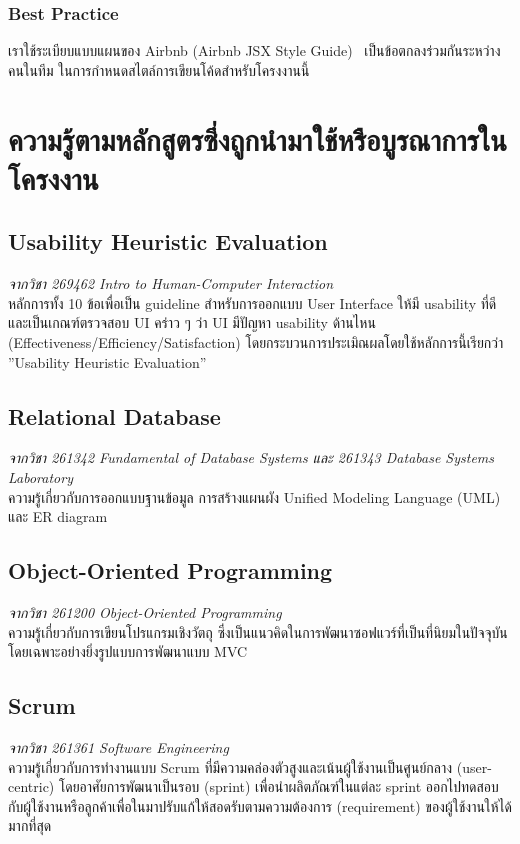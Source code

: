 \subsubsection{Best Practice}
เราใช้ระเบียบแบบแผนของ Airbnb (Airbnb JSX Style Guide)~\cite{airbnb_jsx} เป็นข้อตกลงร่วมกันระหว่างคนในทีม ในการกำหนดสไตล์การเขียนโค้ดสำหรับโครงงานนี้

\section{ความรู้ตามหลักสูตรซึ่งถูกนำมาใช้หรือบูรณาการในโครงงาน}
\subsection{Usability Heuristic Evaluation}
\textit{จากวิชา 269462 Intro to Human-Computer Interaction} \\
หลักการทั้ง 10 ข้อเพื่อเป็น guideline สำหรับการออกแบบ User Interface ให้มี usability ที่ดีและเป็นเกณฑ์ตรวจสอบ UI คร่าว ๆ ว่า UI มีปัญหา usability ด้านไหน (Effectiveness/Efficiency/Satisfaction) โดยกระบวนการประเมิณผลโดยใช้หลักการนี้เรียกว่า ''Usability Heuristic Evaluation''

\subsection{Relational Database}
\textit{จากวิชา 261342 Fundamental of Database Systems และ 261343 Database Systems Laboratory} \\
ความรู้เกี่ยวกับการออกแบบฐานข้อมูล การสร้างแผนผัง Unified Modeling Language (UML) และ ER diagram

\subsection{Object-Oriented Programming}
\textit{จากวิชา 261200 Object-Oriented Programming} \\
ความรู้เกี่ยวกับการเขียนโปรแกรมเชิงวัตถุ ซึ่งเป็นแนวคิดในการพัฒนาซอฟแวร์ที่เป็นที่นิยมในปัจจุบัน โดยเฉพาะอย่างยิ่งรูปแบบการพัฒนาแบบ MVC

\subsection{Scrum}
\textit{จากวิชา 261361 Software Engineering} \\
ความรู้เกี่ยวกับการทำงานแบบ Scrum ที่มีความคล่องตัวสูงและเน้นผู้ใช้งานเป็นศูนย์กลาง (user-centric) โดยอาศัยการพัฒนาเป็นรอบ (sprint) เพื่อนำผลิตภัณฑ์ในแต่ละ sprint ออกไปทดสอบกับผู้ใช้งานหรือลูกค้าเพื่อในมาปรับแก้ให้สอดรับตามความต้องการ (requirement) ของผู้ใช้งานให้ได้มากที่สุด

